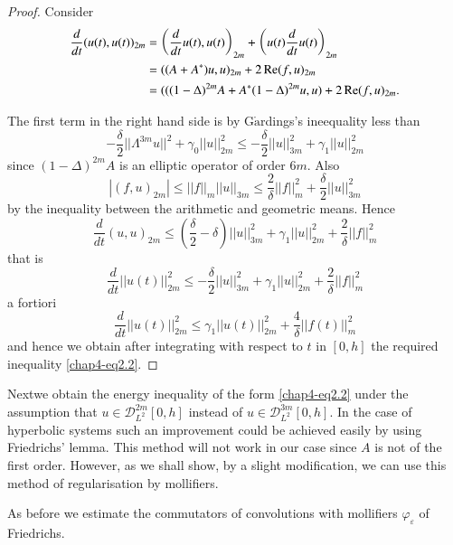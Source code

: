 \begin{proof}
Consider\pageoriginale
\begin{align*}
\frac{d}{dt} (u (t), u(t))_{2m} &= \left(\frac{d}{dt} u (t),u(t)\right)_{2m} 
+\left(u(t)\frac{d}{dt} u(t)\right)_{2m}\\ 
&=((A +A^*)u, u)_{2m} + 2 \operatorname{Re} (f, u)_{2m} \\ 
&= (((1- \Delta)^{2m} A + A^*(1 - \Delta)^{2m}u, u) + 2 \operatorname{Re}
(f,u)_{2m}. 	  
\end{align*}

The first term in the right hand side is by
G$\ring{\text{a}}$rdings's ineequality less than  
\begin{equation}
- \frac{\delta}{2} ||\Lambda^{3m} u ||^2 + \gamma_0 || u ||^2_{2m} \leq -
\frac{\delta}{2} || u ||^2_{3m} + \gamma_1 || u ||_{2m}^2
\tag{2.3} \label{chap4-eq2.3} 
\end{equation}
since $(1 - \Delta )^{2m} A $ is an elliptic operator of order
$6m$. Also  
$$
|(f, u)_{2m}| \leq || f ||_m || u ||_{3m} \leq \frac{2}{\delta} ||f
||^2_m + \frac{\delta}{2} || u ||^2_{3m} 
$$
by the inequality between the arithmetic and geometric means. Hence 
$$
\frac{d}{dt} (u, u)_{2m} \leq \left(\frac{\delta}{2} - \delta\right) || u
||^2_{3m} + \gamma_1 || u ||^2_{2m} + \frac{2}{\delta} || f ||^2_m  
$$
that is 
\begin{equation*}
\frac{d}{dt} || u(t) ||^2_{2m} \leq - \frac{\delta}{2} || u ||^2_{3m}
+ \gamma_1 || u ||^2_{2m} + \frac{2}{\delta} || f||^2_m
\tag{2.4} \label{chap4-eq2.4} 
\end{equation*}
a fortiori 
\begin{equation*}
\frac{d}{dt} || u(t) ||^2_{2m} \leq \gamma_1 || u(t) ||^2_{2m} +
\frac{4}{\delta} || f (t) ||^2_m \tag*{$(2.4)'$} 
\end{equation*}
and hence we obtain after integrating with respect to $t$ in $[0, h]$
the required inequality \eqref{chap4-eq2.2}.  
\end{proof}

Next\pageoriginale we obtain the energy inequality of the form
\eqref{chap4-eq2.2} under the 
assumption that $u \in \mathscr{D}^{2m}_{L^2}[0, h]$ instead
of $u \in \mathscr{D}^{3m}_{L^2}[0, h]$. In the case of
hyperbolic systems such an improvement could be achieved easily by
using Friedrichs' lemma. This method will not work in our case since
$A$ is not of the first order. However, as we shall show, by a slight
modification, we can use this method of regularisation by mollifiers.  

As before we estimate the commutators of convolutions with mollifiers
$\varphi_\varepsilon$ of Friedrichs. 

